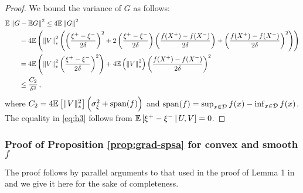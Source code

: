 \begin{proof}
We bound the variance of $G$ as follows:
\begin{align}
\MoveEqLeft \E\left\| G - \E G\right\|^2
 \le 4 \E \left\|G\right\|^2 \nonumber \\
& =  4\E\left( \left\| V \right\|_*^2 \left(\left(\dfrac{\xi^+ - \xi^-}{2\delta}\right)^2  + 2 \left(\dfrac{\xi^+ - \xi^-}{2\delta}\right) \left(\dfrac{f(X^+) - f(X^-)}{2\delta}\right)
+ \left( \dfrac{f(X^+) - f(X^-)}{2\delta} \right)^2 \right)\right) \nonumber \\
&=  4\E\left( \left\| V \right\|_*^2 \left(\dfrac{\xi^+ - \xi^-}{2\delta}\right)^2\right)
+ 4 \E \left(\left\| V \right\|_*^2 \right)\left( \dfrac{f(X^+) - f(X^-)}{2\delta} \right)^2  \label{eq:h3} \\
& \le  \frac{C_2}{\delta^2}\,, \nonumber \label{eq:h4}
\end{align}
where $C_2 = 4 \mathbb{E}\left[\|V\|_*^2\right]\left( \sigma_\xi^2+\operatorname{span}(f)\right)$
and $\operatorname{span}(f) = \sup_{x\in \mathcal{D}} f(x) - \inf_{x\in \mathcal{D}} f(x)$.
The equality in \eqref{eq:h3} follows from $\mathbb{E}\left[ \xi^+-\xi^- \,|\, U,V \right] = 0$.
\end{proof}

\subsubsection*{Proof of Proposition \ref{prop:grad-spsa} for convex and smooth $f$}
The proof follows by parallel arguments to that used in the proof of Lemma 1 in \cite{duchi2015optimal} and we give it here for the sake of completeness.

